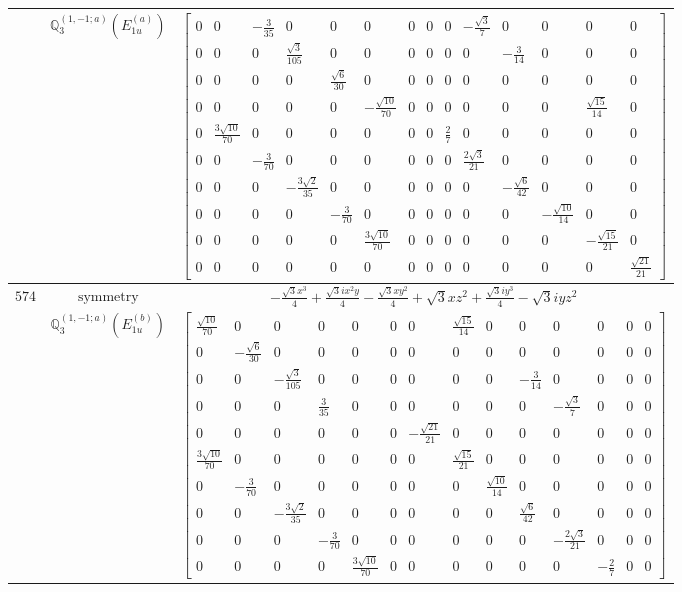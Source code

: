 \documentclass[fleqn,8pt,landscape]{jsarticle}
\begin{document}
\begin{longtable}{ccc}
$  $ & $ \mathbb{Q}_{3}^{(1,-1;a)}(E_{1u}^{(a)}) $ & $ \begin{bmatrix} 0 & 0 & - \frac{3}{35} & 0 & 0 & 0 & 0 & 0 & 0 & - \frac{\sqrt{3}}{7} & 0 & 0 & 0 & 0 \\ 0 & 0 & 0 & \frac{\sqrt{3}}{105} & 0 & 0 & 0 & 0 & 0 & 0 & - \frac{3}{14} & 0 & 0 & 0 \\ 0 & 0 & 0 & 0 & \frac{\sqrt{6}}{30} & 0 & 0 & 0 & 0 & 0 & 0 & 0 & 0 & 0 \\ 0 & 0 & 0 & 0 & 0 & - \frac{\sqrt{10}}{70} & 0 & 0 & 0 & 0 & 0 & 0 & \frac{\sqrt{15}}{14} & 0 \\ 0 & \frac{3 \sqrt{10}}{70} & 0 & 0 & 0 & 0 & 0 & 0 & \frac{2}{7} & 0 & 0 & 0 & 0 & 0 \\ 0 & 0 & - \frac{3}{70} & 0 & 0 & 0 & 0 & 0 & 0 & \frac{2 \sqrt{3}}{21} & 0 & 0 & 0 & 0 \\ 0 & 0 & 0 & - \frac{3 \sqrt{2}}{35} & 0 & 0 & 0 & 0 & 0 & 0 & - \frac{\sqrt{6}}{42} & 0 & 0 & 0 \\ 0 & 0 & 0 & 0 & - \frac{3}{70} & 0 & 0 & 0 & 0 & 0 & 0 & - \frac{\sqrt{10}}{14} & 0 & 0 \\ 0 & 0 & 0 & 0 & 0 & \frac{3 \sqrt{10}}{70} & 0 & 0 & 0 & 0 & 0 & 0 & - \frac{\sqrt{15}}{21} & 0 \\ 0 & 0 & 0 & 0 & 0 & 0 & 0 & 0 & 0 & 0 & 0 & 0 & 0 & \frac{\sqrt{21}}{21} \end{bmatrix} $ \\ \hline
$ 574 $ & $ \text{symmetry} $ & $ - \frac{\sqrt{3} x^{3}}{4} + \frac{\sqrt{3} i x^{2} y}{4} - \frac{\sqrt{3} x y^{2}}{4} + \sqrt{3} x z^{2} + \frac{\sqrt{3} i y^{3}}{4} - \sqrt{3} i y z^{2} $ \\
$  $ & $ \mathbb{Q}_{3}^{(1,-1;a)}(E_{1u}^{(b)}) $ & $ \begin{bmatrix} \frac{\sqrt{10}}{70} & 0 & 0 & 0 & 0 & 0 & 0 & \frac{\sqrt{15}}{14} & 0 & 0 & 0 & 0 & 0 & 0 \\ 0 & - \frac{\sqrt{6}}{30} & 0 & 0 & 0 & 0 & 0 & 0 & 0 & 0 & 0 & 0 & 0 & 0 \\ 0 & 0 & - \frac{\sqrt{3}}{105} & 0 & 0 & 0 & 0 & 0 & 0 & - \frac{3}{14} & 0 & 0 & 0 & 0 \\ 0 & 0 & 0 & \frac{3}{35} & 0 & 0 & 0 & 0 & 0 & 0 & - \frac{\sqrt{3}}{7} & 0 & 0 & 0 \\ 0 & 0 & 0 & 0 & 0 & 0 & - \frac{\sqrt{21}}{21} & 0 & 0 & 0 & 0 & 0 & 0 & 0 \\ \frac{3 \sqrt{10}}{70} & 0 & 0 & 0 & 0 & 0 & 0 & \frac{\sqrt{15}}{21} & 0 & 0 & 0 & 0 & 0 & 0 \\ 0 & - \frac{3}{70} & 0 & 0 & 0 & 0 & 0 & 0 & \frac{\sqrt{10}}{14} & 0 & 0 & 0 & 0 & 0 \\ 0 & 0 & - \frac{3 \sqrt{2}}{35} & 0 & 0 & 0 & 0 & 0 & 0 & \frac{\sqrt{6}}{42} & 0 & 0 & 0 & 0 \\ 0 & 0 & 0 & - \frac{3}{70} & 0 & 0 & 0 & 0 & 0 & 0 & - \frac{2 \sqrt{3}}{21} & 0 & 0 & 0 \\ 0 & 0 & 0 & 0 & \frac{3 \sqrt{10}}{70} & 0 & 0 & 0 & 0 & 0 & 0 & - \frac{2}{7} & 0 & 0 \end{bmatrix} $ \\ \hline

\end{longtable}
\end{document}
